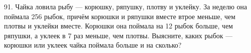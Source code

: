 91. Чайка ловила рыбу --- корюшку, ряпушку, плотву и уклейку. За неделю она поймала 256 рыбок, причём корюшки и ряпушки вместе втрое меньше, чем плотвы и уклейки вместе. Корюшки она поймала на 12 рыбок больше, чем ряпушки, а уклеек в 7 раз меньше, чем плотвы. Выясните, каких рыбок --- корюшки или уклеек чайка поймала больше и на сколько?\\
